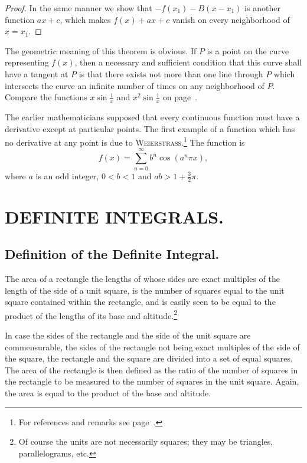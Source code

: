 \documentclass[a4paper,12pt]{book}[2004/02/16]
\providecommand{\colorbox}[2]{#2}
\newcommand{\correction}[2]{\colorbox{corr}{#1}}
\providecommand{\hypertarget}[2]{#2}
\theoremstyle{ilemma}
\theoremstyle{itheorem}
\theoremstyle{iother}
\theoremstyle{icorollary}
\theoremstyle{numcorollary}
\theoremstyle{idefinition}
\renewcommand{\dfrac}[2]{\frac{#1}{#2}}%
\begin{document}
\begin{proof}
In the same manner we show that $-f(x_1)-B(x-x_1)$ is another function
$ax+c$, which makes $f(x)+ax+c$ vanish on every neighborhood of
$x=x_1$.
\end{proof}

The geometric meaning of this theorem is obvious. If $P$ is a point on
the curve representing $f(x)$, then a necessary and sufficient
condition that this curve shall have a tangent at $P$ is that there
exists not more than one line through $P$ which intersects the curve
an infinite number of times on any neighborhood of $P$. Compare the
functions $x \sin \dfrac{1}{x}$ and $x^2 \sin \dfrac{1}{x}$ on
page~\pageref{oscillp51}.

The earlier mathematicians supposed that every continuous function
must have a derivative except at particular points.  The first example
of a function which has no derivative at any point is due to
\correction{\textsc{Weierstrass}}{\textsc{Weiersrtass}}.\footnote{%
    For references and remarks see page~\pageref{oscillp51}.}
The function is\label{nowherediffp150}
\[
  f(x) = \sum_{n=0}^\infty b^n \cos (a^n\pi x),
\]
where $a$ is an odd integer, $0 < b < 1$ and $ab > 1 + \frac32\pi$.




\chapter{DEFINITE INTEGRALS.}\hypertarget{chapVIII}{}%

\section{Definition of the Definite Integral.}\hypertarget{chVIIIsec1}{}%


The area of a rectangle the lengths of whose sides are exact multiples
of the length of the side of a unit square, is the number of squares
equal to the unit square contained within the rectangle, and is easily
seen to be equal to the product of the lengths of its base and
altitude.\footnote{%
    Of course the units are not necessarily squares; they may be
    triangles, parallelograms, etc.}

In case the sides of the rectangle and the side of the unit
square are commensurable, the sides of the rectangle not being
exact multiples of the side of the square, the rectangle and the
square are divided into a set of equal squares. The area of the
rectangle is then defined as the ratio of the number of squares
in the rectangle to be measured to the number of squares in the
unit square. Again, the area is equal to the product of the
base and altitude.
\end{document}
